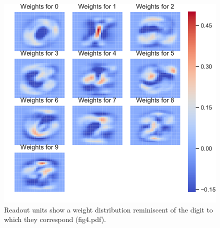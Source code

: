 \documentclass{article}
\begin{document}
\begin{figure}[H]
        \centering
        \includegraphics{fig4.pdf}
        \caption[width=7in]{Readout units show a weight distribution reminiscent of the digit to which they correspond (fig4.pdf).}
\end{figure}
\end{document}
